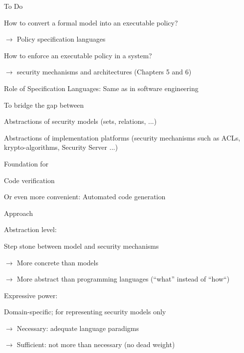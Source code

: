 \documentclass[a4paper]{article}
\begin{document}
\begin{multicols}{3}
    To Do
    \begin{itemize*}
        \item How to convert a formal model into an executable policy?
        \begin{itemize*}
            \item $\rightarrow$  Policy specification languages
        \end{itemize*}
        \item How to enforce an executable policy in a system?
        \begin{itemize*}
            \item $\rightarrow$  security mechanisms and architectures (Chapters 5 and 6)
        \end{itemize*}
    \end{itemize*}

    Role of Specification Languages: Same as in software engineering
    \begin{itemize*}
        \item To bridge the gap between
        \begin{itemize*}
            \item Abstractions of security models (sets, relations, ...)
            \item Abstractions of implementation platforms (security mechanisms such as ACLs, krypto-algorithms, Security Server ...)
        \end{itemize*}
        \item Foundation for
        \begin{itemize*}
            \item Code verification
            \item Or even more convenient: Automated code generation
        \end{itemize*}
    \end{itemize*}


    Approach
    \begin{itemize*}
        \item Abstraction level:
        \begin{itemize*}
            \item Step stone between model and security mechanisms
            \item $\rightarrow$  More concrete than models
            \item $\rightarrow$  More abstract than programming languages (“what” instead of “how“)
        \end{itemize*}
        \item Expressive power:
        \begin{itemize*}
            \item Domain-specific; for representing security models only
            \item $\rightarrow$  Necessary: adequate language paradigms
            \item $\rightarrow$  Sufficient: not more than necessary (no dead weight)
        \end{itemize*}
    \end{itemize*}


\end{multicols}
\end{document}
